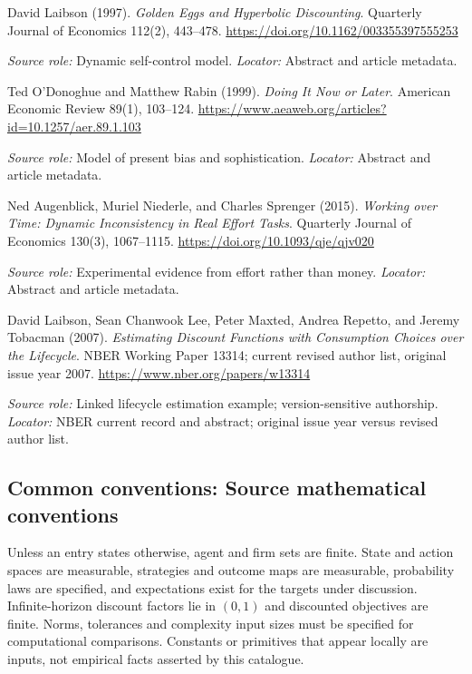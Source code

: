 \documentclass[11pt,a4paper]{article}
\begin{document}
\begin{enumerate}[label={[S\arabic*]},leftmargin=*]

\item David Laibson (1997). \emph{Golden Eggs and Hyperbolic Discounting}. Quarterly Journal of Economics 112(2), 443--478. \url{https://doi.org/10.1162/003355397555253}\par \textit{Source role:} Dynamic self-control model. \textit{Locator:} Abstract and article metadata.

\item Ted O'Donoghue and Matthew Rabin (1999). \emph{Doing It Now or Later}. American Economic Review 89(1), 103--124. \url{https://www.aeaweb.org/articles?id=10.1257/aer.89.1.103}\par \textit{Source role:} Model of present bias and sophistication. \textit{Locator:} Abstract and article metadata.

\item Ned Augenblick, Muriel Niederle, and Charles Sprenger (2015). \emph{Working over Time: Dynamic Inconsistency in Real Effort Tasks}. Quarterly Journal of Economics 130(3), 1067--1115. \url{https://doi.org/10.1093/qje/qjv020}\par \textit{Source role:} Experimental evidence from effort rather than money. \textit{Locator:} Abstract and article metadata.

\item David Laibson, Sean Chanwook Lee, Peter Maxted, Andrea Repetto, and Jeremy Tobacman (2007). \emph{Estimating Discount Functions with Consumption Choices over the Lifecycle}. NBER Working Paper 13314; current revised author list, original issue year 2007. \url{https://www.nber.org/papers/w13314}\par \textit{Source role:} Linked lifecycle estimation example; version-sensitive authorship. \textit{Locator:} NBER current record and abstract; original issue year versus revised author list.

\end{enumerate}

\subsection*{Common conventions: Source mathematical conventions}

Unless an entry states otherwise, agent and firm sets are finite. State and action spaces are measurable, strategies and outcome maps are measurable, probability laws are specified, and expectations exist for the targets under discussion. Infinite-horizon discount factors lie in $(0,1)$ and discounted objectives are finite. Norms, tolerances and complexity input sizes must be specified for computational comparisons. Constants or primitives that appear locally are inputs, not empirical facts asserted by this catalogue.
\end{document}
